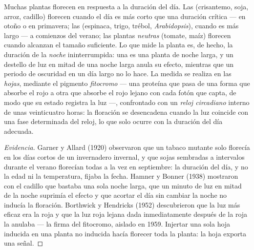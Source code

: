 \begin{proposition}\label{prop:b2:plant-flowering:photoperiod}
Muchas plantas florecen en respuesta a la duración del día. Las
\emph{} (crisantemo, soja, arroz, cadillo) florecen
cuando el día es más corto que una duración crítica --- en otoño o en
primavera; las \emph{} (espinaca, trigo, trébol,
\emph{Arabidopsis}), cuando es más largo --- a comienzos del verano; las
plantas \emph{neutras} (tomate, maíz) florecen cuando alcanzan el tamaño
suficiente. Lo que mide la planta es, de hecho, la duración de la
\emph{noche} ininterrumpida: una  es una planta de
noche larga, y un destello de luz en mitad de una noche larga anula su
efecto, mientras que un periodo de oscuridad en un día largo no lo hace.
La medida se realiza en las \emph{hojas}, mediante el pigmento
\emph{fitocromo} --- una proteína que pasa de una forma que absorbe el rojo
a otra que absorbe el rojo lejano con cada fotón que capta, de modo que
su estado registra la luz ---, confrontado con un \emph{reloj circadiano}
interno de unas veinticuatro horas: la floración se desencadena cuando la
luz coincide con una fase determinada del reloj, lo que solo ocurre con
la duración del día adecuada.
\end{proposition}
\begin{proof}[Evidencia]
Garner y Allard (1920) observaron que un tabaco mutante solo florecía en
los días cortos de un invernadero invernal, y que sojas sembradas a
intervalos durante el verano florecían todas a la vez en septiembre: la
duración del día, y no la edad ni la temperatura, fijaba la fecha. Hamner
y Bonner (1938) mostraron con el cadillo que bastaba una sola noche larga,
que un minuto de luz en mitad de la noche suprimía el efecto y que acortar
el día sin cambiar la noche no inducía la floración. Borthwick y Hendricks
(1952) descubrieron que la luz más eficaz era la roja y que la luz roja
lejana dada inmediatamente después de la roja la anulaba --- la firma del
fitocromo, aislado en 1959. Injertar una sola hoja inducida en una planta
no inducida hacía florecer toda la planta: la hoja exporta una señal.
\end{proof}

